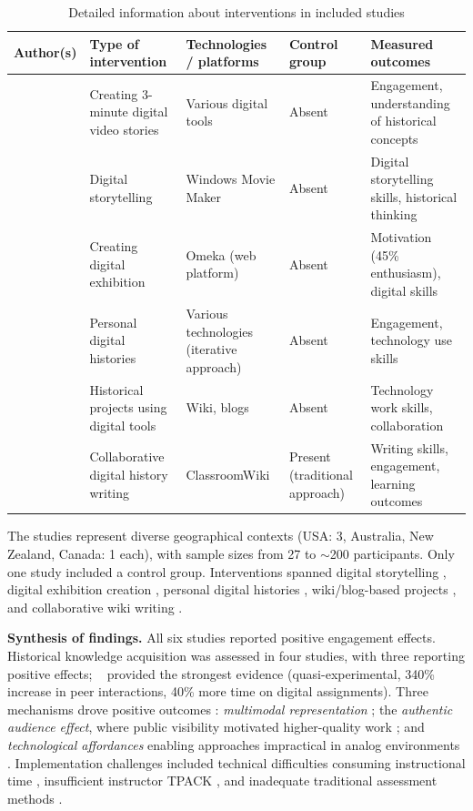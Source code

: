 \begin{table}[!h]
\centering
\caption{Detailed information about interventions in included studies \citep{Korniienko2025cte}}
\label{tab:dh-interventions}
\small
\begin{tabular}{p{2cm}p{3.8cm}p{2.8cm}p{2.2cm}p{2.8cm}}
\hline
\textbf{Author(s)} & \textbf{Type of intervention} & \textbf{Technologies / platforms} & \textbf{Control group} & \textbf{Measured outcomes} \\
\hline
\citet{Bell2016} & Creating 3-minute digital video stories & Various digital tools & Absent & Engagement, understanding of historical concepts \\
\hline
\citet{Coleborne2011} & Digital storytelling & Windows Movie Maker & Absent & Digital storytelling skills, historical thinking \\
\hline
\citet{Davis2017} & Creating digital exhibition & Omeka (web platform) & Absent & Motivation (45\% enthusiasm), digital skills \\
\hline
\citet{Lee2014159} & Personal digital histories & Various technologies (iterative approach) & Absent & Engagement, technology use skills \\
\hline
\citet{McLean20144} & Historical projects using digital tools & Wiki, blogs & Absent & Technology work skills, collaboration \\
\hline
\citet{Soh2013} & Collaborative digital history writing & ClassroomWiki & Present (traditional approach) & Writing skills, engagement, learning outcomes \\
\hline
\end{tabular}
\end{table}

The studies represent diverse geographical contexts (USA: 3, Australia, New Zealand, Canada: 1 each), with sample sizes from 27 to $\sim$200 participants. Only one study \cite{Soh2013} included a control group. Interventions spanned digital storytelling \cite{Bell2016, Coleborne2011}, digital exhibition creation \cite{Davis2017}, personal digital histories \cite{Lee2014159}, wiki/blog-based projects \cite{McLean20144}, and collaborative wiki writing \cite{Soh2013}.

\textbf{Synthesis of findings.} All six studies reported positive engagement effects. Historical knowledge acquisition was assessed in four studies, with three reporting positive effects; \citeauthor{Soh2013}~\cite{Soh2013} provided the strongest evidence (quasi-experimental, 340\% increase in peer interactions, 40\% more time on digital assignments). Three mechanisms drove positive outcomes \cite{KorniienkoSemerikov2024}: \textit{multimodal representation} \cite{Bell2016, Coleborne2011}; the \textit{authentic audience effect}, where public visibility motivated higher-quality work \cite{Davis2017, Lee2014159}; and \textit{technological affordances} enabling approaches impractical in analog environments \cite{Soh2013, McLean20144}. Implementation challenges included technical difficulties consuming instructional time \cite{McLean20144}, insufficient instructor TPACK \cite{Davis2017, Lee2014159}, and inadequate traditional assessment methods \cite{Coleborne2011}.

